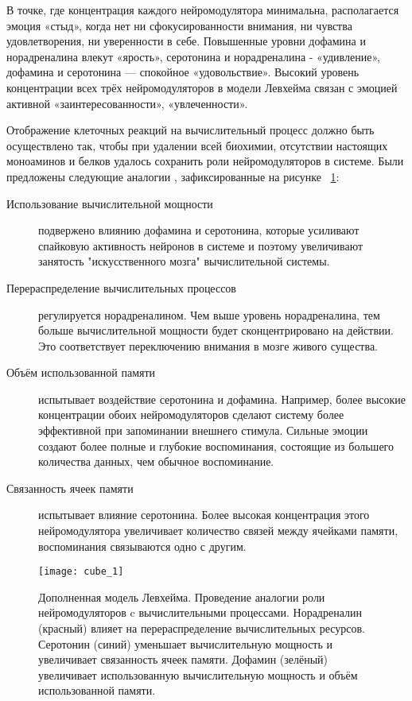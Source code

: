 В точке, где концентрация каждого нейромодулятора минимальна, располагается эмоция «стыд», когда нет ни сфокусированности внимания, ни чувства удовлетворения, ни уверенности в себе. Повышенные уровни дофамина и норадреналина влекут «ярость», серотонина и норадреналина - «удивление», дофамина и серотонина — спокойное «удовольствие». Высокий уровень концентрации всех трёх нейромодуляторов в модели Левхейма связан с эмоцией активной «заинтересованности», «увлеченности».


Отображение клеточных реакций на вычислительный процесс должно быть осуществлено так, чтобы при удалении всей биохимии, отсутствии настоящих моноаминов и белков удалось сохранить роли нейромодуляторов в системе. Были предложены следующие аналогии \cite{talanov2014}, зафиксированные на рисунке ~\ref{fig:cube_1}:
\begin{description}
\item[Использование вычислительной мощности] подвержено влиянию дофамина и серотонина, которые усиливают спайковую активность нейронов в системе и поэтому увеличивают занятость "искусственного мозга" вычислительной системы.
\item[Перераспределение вычислительных процессов] регулируется норадреналином. Чем выше уровень норадреналина, тем больше вычислительной мощности будет сконцентрировано на действии. Это соответствует переключению внимания в мозге живого существа.
\item[Объём использованной памяти] испытывает воздействие серотонина и дофамина. Например, более высокие концентрации обоих нейромодуляторов сделают систему более эффективной при запоминании внешнего стимула. Сильные эмоции создают более полные и глубокие воспоминания, состоящие из большего количества данных, чем обычное воспоминание.
\item[Связанность ячеек памяти] испытывает влияние серотонина. Более высокая концентрация этого нейромодулятора увеличивает количество связей между ячейками памяти, воспоминания связываются одно с другим.
\end{description}



\begin{figure}
	\centering
	\texttt{[image: cube\_1]}
	\caption{Дополненная модель Левхейма. Проведение аналогии роли нейромодуляторов c вычислительными процессами. Норадреналин (красный) влияет на перераспределение вычислительных ресурсов. Серотонин (синий) уменьшает вычислительную мощность и увеличивает связанность ячеек памяти. Дофамин (зелёный) увеличивает использованную вычислительную мощность и объём использованной памяти.}
	\label{fig:cube_1}
\end{figure}
